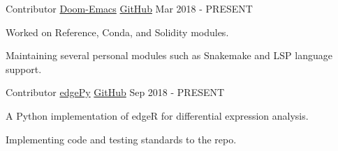 

\begin{cventries}

	\cventry
	{Contributor} %
	{\href{https://github.com/hlissner/doom-emacs}{Doom-Emacs}} %
	{\href{https://github.com/hlissner/doom-emacs}{GitHub}} %
	{Mar 2018 - PRESENT} %
	{
		\begin{cvitems} %
			\item {Worked on Reference, Conda, and Solidity modules.}
			\item {Maintaining several personal modules such as Snakemake and LSP language support.}
		\end{cvitems}
	}

	\cventry
	{Contributor} %
	{\href{https://github.com/r-bioinformatics/edgePy}{edgePy}} %
	{\href{https://github.com/r-bioinformatics/edgePy}{GitHub}} %
	{Sep 2018 - PRESENT} %
	{
		\begin{cvitems} %
			\item {A Python implementation of edgeR for differential expression analysis.}
			\item {Implementing code and testing standards to the repo.}
		\end{cvitems}
	}


\end{cventries}
